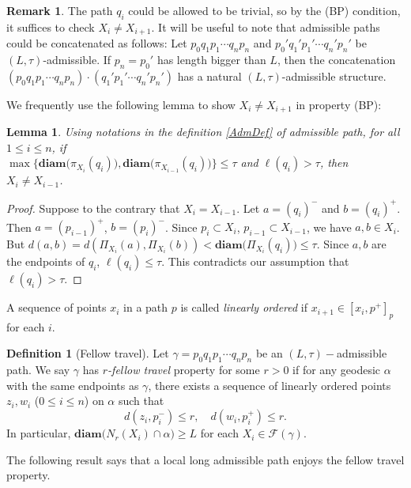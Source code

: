 \documentclass{amsart}
\numberwithin{thm}{section}
\numberwithin{figure}{section}
\newtheorem{lem}[thm]{Lemma}
\theoremstyle{definition}
\newtheorem{remark}[thm]{Remark}
\theoremstyle{definition}
\newtheorem{defn}[thm]{Definition}
\theoremstyle{remark}
\newcommand{\f}{\mathscr F}
\newcommand{\diam }[1]{{\textbf{diam}\big(#1\big)}}
\numberwithin{equation}{section}
\theoremstyle{plain}
\begin{document}
\begin{remark}\label{ConcatenationAdmPath}
    The path $q_i$ could be allowed to be trivial, so by the (BP) condition, it suffices to check $X_i\ne X_{i+1}$. It will be useful to note that admissible paths could be concatenated as follows: Let $p_0q_1p_1\cdots q_np_n$ and $p_0'q_1'p_1'\cdots q_n'p_n'$ be $(L,\tau)$-admissible. If $p_n=p_0'$ has length bigger than $L$, then the concatenation $(p_0q_1p_1\cdots q_np_n)\cdot (q_1'p_1'\cdots q_n'p_n')$ has a natural $(L,\tau)$-admissible structure.  
\end{remark}

    
    We frequently use the following lemma to show $X_i\neq X_{i+1}$ in property (BP):
    \begin{lem}\label{LL2ImplyBP}
        Using notations in the definition \ref{AdmDef} of admissible path, for all $1\le i\le n$, if\\ $\max\{ \diam{\pi_{X_{i}}(q_{i})}, \diam{\pi_{X_{i-1}}(q_{i})}\}\leq\tau$ and $\ell(q_{i}) > \tau$, then $X_i \neq X_{i-1}$.
    \end{lem}
    \begin{proof}
        Suppose to the contrary that $X_i = X_{i-1}$. Let $a = (q_i)^-$ and $b = (q_i)^+$. Then $a = (p_{i-1})^+$, $b = (p_i)^-$. Since $p_i\subset X_i$, $p_{i-1}\subset X_{i-1}$, we have $a, b\in X_i$. But $d(a, b) = d(\Pi_{X_i}(a), \Pi_{X_i}(b)) < \diam{\Pi_{X_i}(q_i)} \le \tau$. Since $a,b$ are the endpoints of $q_i$, $\ell(q_i)\le \tau$. This contradicts our assumption that $\ell(q_i) > \tau$.
    \end{proof}



A sequence of points $x_i$ in a path $p$   is called \textit{linearly ordered} if $x_{i+1}\in [x_i, p^+]_p$ for each $i$. 


\begin{defn}[Fellow travel]\label{Fellow}
Let   $\gamma = p_0 q_1 p_1 \cdots q_n p_n$ be an $(L, \tau)-$admissible
path. We say $\gamma$ has \textit{$r$-fellow travel} property for some $r>0$   if for any geodesic  
$\alpha$  with the same endpoints as $\gamma$,   there exists a sequence of linearly ordered points $z_i,
w_i$ ($0 \le i \le n$) on $\alpha$ such that  
$$d(z_i, p_{i}^-) \le r,\quad d(w_i, p_{i}^+) \le r.$$
In particular, $\diam {N_r(X_i)\cap \alpha} \ge L$ for each $X_i\in \f(\gamma)$. 
\end{defn}
The following result  says that   a local long admissible path enjoys the fellow travel property.
 
\end{document}
